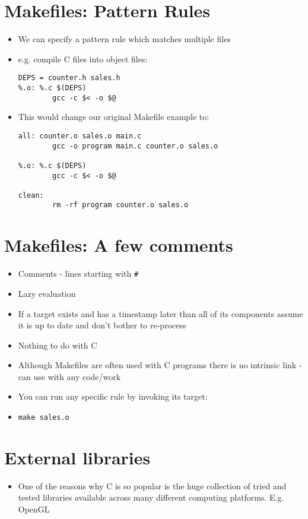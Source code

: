 \documentclass{article}
\begin{document}
\section{Makefiles: Pattern Rules}
\begin{itemize}
\item We can specify a pattern rule which matches multiple files
\item e.g. compile C files into object files:
\begin{verbatim}
DEPS = counter.h sales.h
%.o: %.c $(DEPS)
        gcc -c $< -o $@
\end{verbatim}
\item This would change our original Makefile example to:
\begin{verbatim}
all: counter.o sales.o main.c
        gcc -o program main.c counter.o sales.o

%.o: %.c $(DEPS)
        gcc -c $< -o $@

clean:
        rm -rf program counter.o sales.o
\end{verbatim}
\end{itemize}



\section{Makefiles: A few comments}
\begin{itemize}
\item Comments - lines starting with \verb!#!
\item Lazy evaluation
\item If a target exists and has a timestamp later than all of its components assume it is up to date and don't bother to re-process
\item Nothing to do with C
\item Although Makefiles are often used with C programs there is no intrinsic link - can use with any code/work
\item You can run any specific rule by invoking its target:
\item \verb!make sales.o!
\end{itemize}



\section{External libraries}
\begin{itemize}
\item One of the reasons why C is so popular is the huge collection of tried and tested libraries available across many different computing platforms.  E.g.  OpenGL
\end{itemize}
\end{document}
